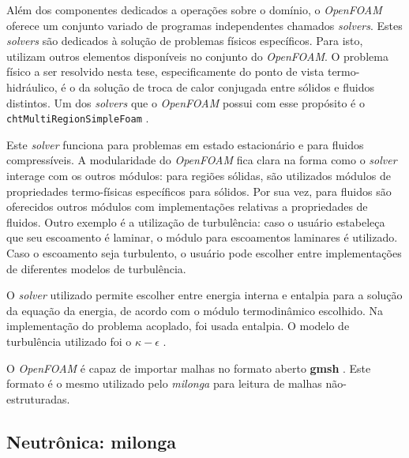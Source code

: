Além dos componentes dedicados a operações sobre o domínio, o \textit{OpenFOAM} oferece um conjunto variado
de programas independentes chamados \textit{solvers}. Estes \textit{solvers} são dedicados à solução de
problemas físicos específicos. Para isto, utilizam outros elementos disponíveis no conjunto do
\textit{OpenFOAM}. O problema físico a ser resolvido nesta tese, especificamente do ponto de vista
termo-hidráulico, é o da solução de troca de calor conjugada entre sólidos e
fluidos distintos. Um dos \textit{solvers} que o \textit{OpenFOAM} possui com esse propósito é o
\texttt{chtMultiRegionSimpleFoam} \cite{OpenFOAM2015}.

Este \textit{solver} funciona para problemas em estado estacionário e para
fluidos compressíveis. A modularidade do \textit{OpenFOAM}
fica clara na forma como o \textit{solver} interage com os outros módulos: para regiões sólidas,
são utilizados módulos de propriedades termo-físicas específicos para sólidos. Por sua vez, para
fluidos são oferecidos outros módulos com implementações relativas a propriedades de fluidos.
Outro exemplo é a utilização de turbulência: caso o usuário estabeleça que seu escoamento é laminar,
o módulo para escoamentos laminares é utilizado. Caso o escoamento seja turbulento, o usuário pode
escolher entre implementações de diferentes modelos de turbulência.

O \textit{solver} utilizado permite escolher entre energia interna e entalpia para a solução
da equação da energia, de acordo com o módulo termodinâmico escolhido. Na implementação do
problema acoplado, foi usada entalpia. O modelo de turbulência utilizado foi o $\kappa-\epsilon$
\cite{Launder1974}.


O \textit{OpenFOAM} é capaz de importar malhas no formato aberto \textbf{gmsh} \cite{Geuzane2009}. Este
formato é o mesmo utilizado pelo \textit{milonga} para leitura de malhas não-estruturadas.




\subsection{Neutrônica: \textbf{milonga}}
\label{subs:milonga}

